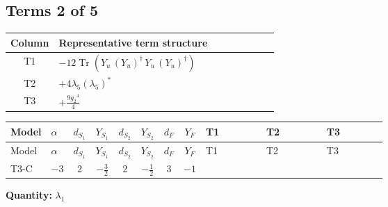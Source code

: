 \documentclass[8pt]{article}
\begin{document}
\begin{landscape}
\subsection*{Terms 2 of 5}
\begin{center}
\begin{tabular}{@{}c >{\raggedright\arraybackslash}p{0.82\linewidth}@{}}
\toprule
Column & Representative term structure \\
\midrule
T1 & \(\displaystyle -12 \operatorname{Tr}\!\left({Y_u}\,\left({Y_u}\right)^{\dagger}\,{Y_u}\,\left({Y_u}\right)^{\dagger}\right)\) \\
\midrule
T2 & \(\displaystyle +4 {\lambda_5} \left({\lambda_5}\right)^{*}\) \\
\midrule
T3 & \(\displaystyle +\frac{9 {g_2}^4}{4}\) \\
\midrule
\bottomrule
\end{tabular}
\end{center}
\smallskip
\tiny
\begin{longtable}{@{}llcccccc >{\raggedright\arraybackslash}p{0.21\linewidth} >{\raggedright\arraybackslash}p{0.21\linewidth} >{\raggedright\arraybackslash}p{0.21\linewidth}@{}}
\toprule
Model & $\alpha$ & $d_{S_1}$ & $Y_{S_1}$ & $d_{S_2}$ & $Y_{S_2}$ & $d_F$ & $Y_F$ & T1 & T2 & T3 \\
\midrule
\endfirsthead
\toprule
Model & $\alpha$ & $d_{S_1}$ & $Y_{S_1}$ & $d_{S_2}$ & $Y_{S_2}$ & $d_F$ & $Y_F$ & T1 & T2 & T3 \\
\midrule
\endhead
T3-C & $-3$ & $2$ & $-\frac{3}{2}$ & $2$ & $-\frac{1}{2}$ & $3$ & $-1$ & \scriptsize\adjustbox{max width=\linewidth}{$\begin{gathered} -12 \operatorname{Tr}\!\left({Y_u}\,\left({Y_u}\right)^{\dagger}\,{Y_u}\,\left({Y_u}\right)^{\dagger}\right)\end{gathered}$} & \scriptsize\adjustbox{max width=\linewidth}{$\begin{gathered} +4 {\lambda_5} \left({\lambda_5}\right)^{*}\end{gathered}$} & \scriptsize\adjustbox{max width=\linewidth}{$\begin{gathered} +\frac{9 {g_2}^4}{4}\end{gathered}$} \\
\midrule
\bottomrule
\end{longtable}
\clearpage
\noindent\textbf{Quantity: }$\lambda_1$\par\smallskip

\end{landscape}
\end{document}

